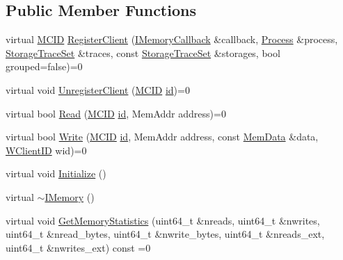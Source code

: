 \subsection*{Public Member Functions}
\begin{DoxyCompactItemize}
\item 
virtual \hyperlink{namespace_simulator_a4b5747ff30c62c6373badf3b53b9abf7}{M\+C\+I\+D} \hyperlink{class_simulator_1_1_i_memory_a2ec936cf9540c9582ad6ef073eb86c6f}{Register\+Client} (\hyperlink{class_simulator_1_1_i_memory_callback}{I\+Memory\+Callback} \&callback, \hyperlink{class_simulator_1_1_process}{Process} \&process, \hyperlink{class_simulator_1_1_storage_trace_set}{Storage\+Trace\+Set} \&traces, const \hyperlink{class_simulator_1_1_storage_trace_set}{Storage\+Trace\+Set} \&storages, bool grouped=false)=0
\item 
virtual void \hyperlink{class_simulator_1_1_i_memory_a3aa93754404189b8e324dae14dc7ea89}{Unregister\+Client} (\hyperlink{namespace_simulator_a4b5747ff30c62c6373badf3b53b9abf7}{M\+C\+I\+D} \hyperlink{mtconf_8c_aa3185401f04d30bd505daebf48c39cc5}{id})=0
\item 
virtual bool \hyperlink{class_simulator_1_1_i_memory_a1a8aec925231e42452a3049ee237b1b1}{Read} (\hyperlink{namespace_simulator_a4b5747ff30c62c6373badf3b53b9abf7}{M\+C\+I\+D} \hyperlink{mtconf_8c_aa3185401f04d30bd505daebf48c39cc5}{id}, Mem\+Addr address)=0
\item 
virtual bool \hyperlink{class_simulator_1_1_i_memory_aa90c1a140ec0db89378f4361314f7139}{Write} (\hyperlink{namespace_simulator_a4b5747ff30c62c6373badf3b53b9abf7}{M\+C\+I\+D} \hyperlink{mtconf_8c_aa3185401f04d30bd505daebf48c39cc5}{id}, Mem\+Addr address, const \hyperlink{struct_simulator_1_1_mem_data}{Mem\+Data} \&data, \hyperlink{namespace_simulator_a0de605c35951a450d074222efcef6359}{W\+Client\+I\+D} wid)=0
\item 
virtual void \hyperlink{class_simulator_1_1_i_memory_a443f7bd5f2eac34d40ab1b43a6b04a59}{Initialize} ()
\item 
virtual \hyperlink{class_simulator_1_1_i_memory_a7bfabbf17539a8f66cde92dc153b32e3}{$\sim$\+I\+Memory} ()
\item 
virtual void \hyperlink{class_simulator_1_1_i_memory_a14263220c662bbd2f65b0d4a2c915376}{Get\+Memory\+Statistics} (uint64\+\_\+t \&nreads, uint64\+\_\+t \&nwrites, uint64\+\_\+t \&nread\+\_\+bytes, uint64\+\_\+t \&nwrite\+\_\+bytes, uint64\+\_\+t \&nreads\+\_\+ext, uint64\+\_\+t \&nwrites\+\_\+ext) const =0
\end{DoxyCompactItemize}


